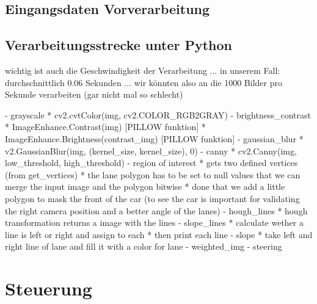 \subsection{Eingangsdaten Vorverarbeitung} %






\subsection{Verarbeitungsstrecke unter Python}

wichtig ist auch die Geschwindigkeit der Verarbeitung ... in unserem Fall: durchschnittlich 0.06 Sekunden ... wir könnten also an die 1000 Bilder pro Sekunde verarbeiten (gar nicht mal so schlecht)


- grayscale
    * cv2.cvtColor(img, cv2.COLOR_RGB2GRAY)
- brightness_contrast
    * ImageEnhance.Contrast(img)                [PILLOW funktion]
    * ImageEnhance.Brightness(contrast_img)     [PILLOW funktion]
- gaussian_blur
    * v2.GaussianBlur(img, (kernel_size, kernel_size), 0)
- canny
    * cv2.Canny(img, low_threshold, high_threshold)
- region of interest
    * gets two defined vertices (from get_vertices)
    * the lane polygon has to be set to null values that we can merge the input image and the polygon bitwise
    * done that we add a little polygon to mask the front of the car 
        (to see the car is important for validating the right camera position and a better angle of the lanes)
- hough_lines
    * hough transformation returns a image with the lines
- slope_lines
    * calculate wether a line is left or right and assign to each
    * then print each line
- slope
    * take left and right line of lane and fill it with a color for lane
- weighted_img
- steering


\section{Steuerung} %

